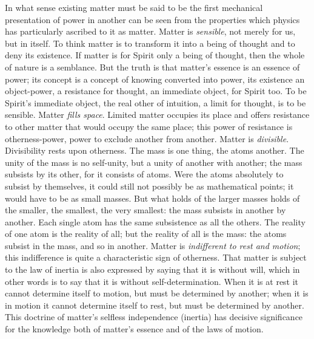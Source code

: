\documentclass[12pt,a4paper]{book}
\begin{document}
In what sense existing matter must be said to be the first mechanical presentation of
power in another can be seen from the properties which physics has particularly
ascribed to it as matter. Matter is \emph{sensible}, not merely for us, but in itself.
To think matter is to transform it into a being of thought and to deny its existence.
If matter is for Spirit only a being of thought, then the whole of nature is a
semblance. But the truth is that matter's essence is an essence of power; its concept
is a concept of knowing converted into power, its existence an object-power, a
resistance for thought, an immediate object, for Spirit too. To be Spirit's immediate
object, the real other of intuition, a limit for thought, is to be sensible. Matter
\emph{fills space}. Limited matter occupies its place and offers resistance to other
matter that would occupy the same place; this power of resistance is otherness-power,
power to exclude another from another. Matter is \emph{divisible}. Divisibility rests
upon otherness. The mass is one thing, the atoms another. The unity of the mass is no
self-unity, but a
unity of another with another; the mass subsists by its other, for it consists of
atoms. Were the atoms absolutely to subsist by themselves, it could still not possibly
be as mathematical points; it would have to be as small masses. But what holds of the
larger masses holds of the smaller, the smallest, the very smallest: the mass subsists
in another by another. Each single atom has the same subsistence as all the others. The
reality of one atom is the reality of all; but the reality of all is the mass: the atoms
subsist in the mass, and so in another. Matter is \emph{indifferent to rest and motion};
this indifference is quite a characteristic sign of otherness. That matter is subject to
the law of inertia is also expressed by saying that it is without will, which in other
words is to say that it is without self-determination. When it is at rest it cannot
determine itself to motion, but must be determined by another; when it is in motion it
cannot determine itself to rest, but must be determined by another. This doctrine of
matter's selfless independence (inertia) has decisive significance for the knowledge
both of matter's essence and of the laws of motion.
\end{document}
